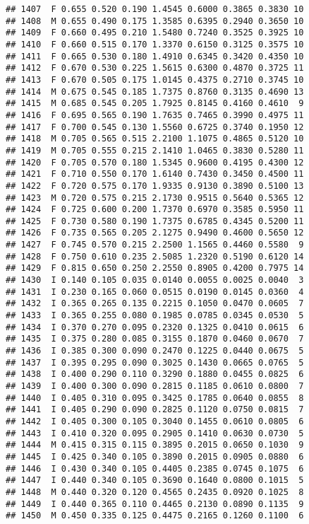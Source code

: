 \documentclass[
]{article}
\begin{document}
\begin{verbatim}
## 1407  F 0.655 0.520 0.190 1.4545 0.6000 0.3865 0.3830 10
## 1408  M 0.655 0.490 0.175 1.3585 0.6395 0.2940 0.3650 10
## 1409  F 0.660 0.495 0.210 1.5480 0.7240 0.3525 0.3925 10
## 1410  F 0.660 0.515 0.170 1.3370 0.6150 0.3125 0.3575 10
## 1411  F 0.665 0.530 0.180 1.4910 0.6345 0.3420 0.4350 10
## 1412  F 0.670 0.530 0.225 1.5615 0.6300 0.4870 0.3725 11
## 1413  F 0.670 0.505 0.175 1.0145 0.4375 0.2710 0.3745 10
## 1414  M 0.675 0.545 0.185 1.7375 0.8760 0.3135 0.4690 13
## 1415  M 0.685 0.545 0.205 1.7925 0.8145 0.4160 0.4610  9
## 1416  F 0.695 0.565 0.190 1.7635 0.7465 0.3990 0.4975 11
## 1417  F 0.700 0.545 0.130 1.5560 0.6725 0.3740 0.1950 12
## 1418  M 0.705 0.565 0.515 2.2100 1.1075 0.4865 0.5120 10
## 1419  M 0.705 0.555 0.215 2.1410 1.0465 0.3830 0.5280 11
## 1420  F 0.705 0.570 0.180 1.5345 0.9600 0.4195 0.4300 12
## 1421  F 0.710 0.550 0.170 1.6140 0.7430 0.3450 0.4500 11
## 1422  F 0.720 0.575 0.170 1.9335 0.9130 0.3890 0.5100 13
## 1423  M 0.720 0.575 0.215 2.1730 0.9515 0.5640 0.5365 12
## 1424  F 0.725 0.600 0.200 1.7370 0.6970 0.3585 0.5950 11
## 1425  F 0.730 0.580 0.190 1.7375 0.6785 0.4345 0.5200 11
## 1426  F 0.735 0.565 0.205 2.1275 0.9490 0.4600 0.5650 12
## 1427  F 0.745 0.570 0.215 2.2500 1.1565 0.4460 0.5580  9
## 1428  F 0.750 0.610 0.235 2.5085 1.2320 0.5190 0.6120 14
## 1429  F 0.815 0.650 0.250 2.2550 0.8905 0.4200 0.7975 14
## 1430  I 0.140 0.105 0.035 0.0140 0.0055 0.0025 0.0040  3
## 1431  I 0.230 0.165 0.060 0.0515 0.0190 0.0145 0.0360  4
## 1432  I 0.365 0.265 0.135 0.2215 0.1050 0.0470 0.0605  7
## 1433  I 0.365 0.255 0.080 0.1985 0.0785 0.0345 0.0530  5
## 1434  I 0.370 0.270 0.095 0.2320 0.1325 0.0410 0.0615  6
## 1435  I 0.375 0.280 0.085 0.3155 0.1870 0.0460 0.0670  7
## 1436  I 0.385 0.300 0.090 0.2470 0.1225 0.0440 0.0675  5
## 1437  I 0.395 0.295 0.090 0.3025 0.1430 0.0665 0.0765  5
## 1438  I 0.400 0.290 0.110 0.3290 0.1880 0.0455 0.0825  6
## 1439  I 0.400 0.300 0.090 0.2815 0.1185 0.0610 0.0800  7
## 1440  I 0.405 0.310 0.095 0.3425 0.1785 0.0640 0.0855  8
## 1441  I 0.405 0.290 0.090 0.2825 0.1120 0.0750 0.0815  7
## 1442  I 0.405 0.300 0.105 0.3040 0.1455 0.0610 0.0805  6
## 1443  I 0.410 0.320 0.095 0.2905 0.1410 0.0630 0.0730  5
## 1444  M 0.415 0.315 0.115 0.3895 0.2015 0.0650 0.1030  9
## 1445  I 0.425 0.340 0.105 0.3890 0.2015 0.0905 0.0880  6
## 1446  I 0.430 0.340 0.105 0.4405 0.2385 0.0745 0.1075  6
## 1447  I 0.440 0.340 0.105 0.3690 0.1640 0.0800 0.1015  5
## 1448  M 0.440 0.320 0.120 0.4565 0.2435 0.0920 0.1025  8
## 1449  I 0.440 0.365 0.110 0.4465 0.2130 0.0890 0.1135  9
## 1450  M 0.450 0.335 0.125 0.4475 0.2165 0.1260 0.1100  6

\end{verbatim}
\end{document}
